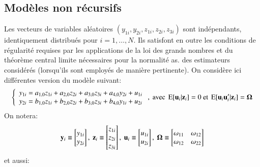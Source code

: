 \documentclass[10pt, reqno]{amsart}
\begin{document}
\subsection{Modèles non récursifs}
Les vecteurs de variables aléatoires $(y_{1i} , y_{2i} , z_{1i} , z_{2i} , z_{3i})$ sont indépendants, identiquement
distribués pour $i=1,\ldots, N$. Ils satisfont en outre les conditions de régularité requises 
par les applications de la loi des grands nombres et du théorème central limite nécessaires 
pour la normalité as. des estimateurs considérés (lorsqu’ils sont employés de manière pertinente).
On considère ici différentes version du modèle suivant:
\begin{align}
    \left\{
        \begin{array}{l}
    y_{1i} =  a_{1,0}z_{1i}+ a_{2,0}z_{2i} + a_{3,0}z_{3i} + a_{4,0}y_{2i} + u_{1i}\\
    y_{2i} = b_{1,0}z_{1i} + b_{2,0}z_{2i} + b_{3,0}z_{3i} + b_{4,0}y_{1i} + u_{2i}
        \end{array}
        \right. , 
        \ \text{avec} \ \Exp[\boldu_i|\boldz_i] = 0 \ \text{et} \ \Exp[\boldu_i\boldu_i^\prime|\boldz_i]=\boldOmega
        \label{eq3}
\end{align}
    On notera:
\[
    \boldy_i \equiv \begin{bmatrix}
        y_{1i}\\
        y_{2i}
    \end{bmatrix}
    , \
    \boldz_i \equiv \begin{bmatrix}
        z_{1i}\\
        z_{2i}\\
        z_{3i}
    \end{bmatrix}
    , \
    \boldu_i \equiv \begin{bmatrix}
        u_{1i}\\
        u_{2i}
    \end{bmatrix}
    , \ 
    \boldOmega \equiv \begin{bmatrix}
        \omega_{11} & \omega_{12}\\
        \omega_{12} & \omega_{22}
    \end{bmatrix}
    \]
    et aussi:
\end{document}
